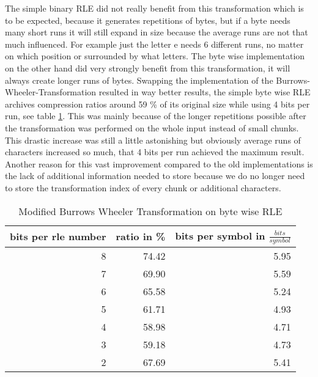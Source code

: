 \par{
The simple binary RLE did not really benefit from this transformation which is to be expected, because it generates repetitions of bytes, but if a byte needs many short runs it will still expand in size because the average runs are not that much influenced. For example just the letter e needs 6 different runs, no matter on which position or surrounded by what letters. The byte wise implementation on the other hand did very strongly benefit from this transformation, it will always create longer runs of bytes. Swapping the implementation of the Burrows-Wheeler-Transformation resulted in way better results, the simple byte wise RLE archives compression ratios around 59 \% of its original size while using 4 bits per run, see table \ref{tab:t13 Modified Burrows Wheeler Transformation on byte wise RLE}. This was mainly because of the longer repetitions possible after the transformation was performed on the whole input instead of small chunks. This drastic increase was still a little astonishing but obviously average runs of characters increased so much, that 4 bits per run achieved the maximum result. Another reason for this vast improvement compared to the old implementations is the lack of additional information needed to store because we do no longer need to store the transformation index of every chunk or additional characters.
	\begin{table}[h]
		\centering
		\begin{tabular}{r|r|r}	
			bits per rle number & ratio in \% & bits per symbol in $\frac{bits}{symbol}$\\
			\hline
			8 & 74.42 & 5.95\\
			7 & 69.90 & 5.59\\
			6 & 65.58 & 5.24\\
			5 & 61.71 & 4.93\\
			4 & 58.98 & 4.71\\
			3 & 59.18 & 4.73\\
			2 & 67.69 & 5.41
		\end{tabular}
		\caption{Modified Burrows Wheeler Transformation on byte wise RLE}
		\label{tab:t13 Modified Burrows Wheeler Transformation on byte wise RLE}
	\end{table}
}
